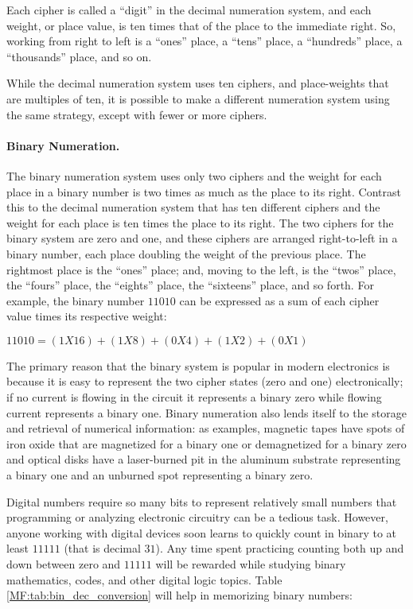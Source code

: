 Each cipher is called a ``digit'' in the decimal numeration system, and each weight, or place value, is ten times that of the place to the immediate right. So, working from right to left is a ``ones'' place, a ``tens'' place, a ``hundreds'' place, a ``thousands'' place, and so on.

While the decimal numeration system uses ten ciphers, and place-weights that are multiples of ten, it is possible to make a different numeration system using the same strategy, except with fewer or more ciphers.

\paragraph{Binary Numeration.} The binary numeration system uses only two ciphers and the weight for each place in a binary number is two times as much as the place to its right. Contrast this to the decimal numeration system that has ten different ciphers and the weight for each place is ten times the place to its right. The two ciphers for the binary system are zero and one, and these ciphers are arranged right-to-left in a binary number, each place doubling the weight of the previous place. The rightmost place is the ``ones'' place; and, moving to the left, is the ``twos'' place, the ``fours'' place, the ``eights'' place, the ``sixteens'' place, and so forth. For example, the binary number $ 11010 $ can be expressed as a sum of each cipher value times its respective weight:

\begin{center}
  $ 11010 = (1 X 16) + (1 X 8) + (0 X 4) + (1 X 2) + (0 X 1) $
\end{center}

The primary reason that the binary system is popular in modern electronics is because it is easy to represent the two cipher states (zero and one) electronically; if no current is flowing in the circuit it represents a binary zero while flowing current represents a binary one. Binary numeration also lends itself to the storage and retrieval of numerical information: as examples, magnetic tapes have spots of iron oxide that are magnetized for a binary one or demagnetized for a binary zero and optical disks have a laser-burned pit in the aluminum substrate representing a binary one and an unburned spot representing a binary zero.

Digital numbers require so many bits to represent relatively small numbers that programming or analyzing electronic circuitry can be a tedious task. However, anyone working with digital devices soon learns to quickly count in binary to at least $ 11111 $ (that is decimal $ 31 $). Any time spent practicing counting both up and down between zero and $ 11111 $ will be rewarded while studying binary mathematics, codes, and other digital logic topics. Table \ref{MF:tab:bin_dec_conversion} will help in memorizing binary numbers:

